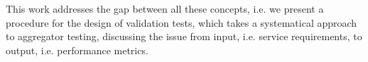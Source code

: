 This work addresses the gap between all these concepts, i.e. we present a procedure for the design of validation tests, which takes a systematical approach to aggregator testing, discussing the issue from input, i.e. service requirements, to output, i.e. performance metrics.





